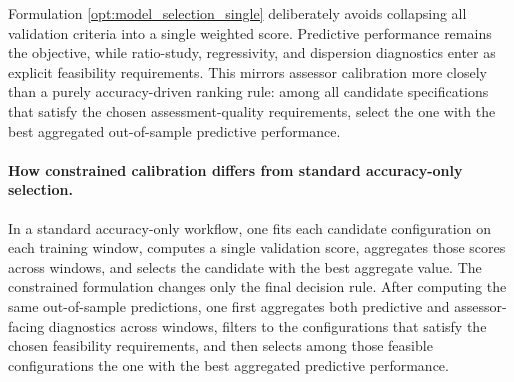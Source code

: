 \documentclass[12pt, draft]{article}
\theoremstyle{plain}
\theoremstyle{definition}
\newcommand{\1}{\mathbf{1}}
\renewcommand{\H}{\mathcal{H}}
\begin{document}
{Formulation \eqref{opt:model_selection_single} deliberately avoids collapsing all validation criteria into a single weighted score. Predictive performance remains the objective, while ratio-study, regressivity, and dispersion diagnostics enter as explicit feasibility requirements. This mirrors assessor calibration more closely than a purely accuracy-driven ranking rule: among all candidate specifications that satisfy the chosen assessment-quality requirements, select the one with the best aggregated out-of-sample predictive performance.

\paragraph{How constrained calibration differs from standard accuracy-only selection.}
In a standard accuracy-only workflow, one fits each candidate configuration on each training window, computes a single validation score, aggregates those scores across windows, and selects the candidate with the best aggregate value. The constrained formulation changes only the final decision rule. After computing the same out-of-sample predictions, one first aggregates both predictive and assessor-facing diagnostics across windows, filters to the configurations that satisfy the chosen feasibility requirements, and then selects among those feasible configurations the one with the best aggregated predictive performance.
}



\end{document}
